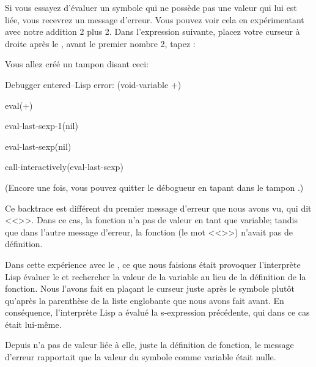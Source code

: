 Si vous essayez d'évaluer un symbole qui ne possède pas une valeur qui
lui est liée, vous recevrez un message d'erreur. Vous pouvez voir cela
en expérimentant avec notre addition 2 plus 2. Dans l'expression
suivante, placez votre curseur à droite après le \tm{+}, avant le
premier nombre 2, tapez  :
\begin{center}
\end{center}
Vous allez créé un tampon  disant ceci:
{\ttfamily
\begin{flushleft}
  Debugger entered--Lisp error: (void-variable +)

  eval(+)

  eval-last-sexp-1(nil)

  eval-last-sexp(nil)

  call-interactively(eval-last-sexp)
\end{flushleft}
}

(Encore une fois, vous pouvez quitter le débogueur en tapant 
dans le tampon .)

Ce backtrace est différent du premier message d'erreur que nous avons
vu, qui dit <<>>. Dans ce cas, la fonction n'a pas de valeur en tant que
variable; tandis que dans l'autre message d'erreur, la fonction (le
mot <<>>) n'avait pas de définition.

Dans cette expérience avec le \tm{+}, ce que nous faisions était
provoquer l'interprète Lisp évaluer le \tm{+} et rechercher la valeur
de la variable au lieu de la définition de la fonction. Nous l'avons
fait en plaçant le curseur juste après le symbole plutôt qu'après la
parenthèse de la liste englobante que nous avons fait avant. En
conséquence, l'interprète Lisp a évalué la s-expression précédente,
qui dans ce cas était \tm{+} lui-même.

Depuis \tm{+} n'a pas de valeur liée à elle, juste la définition de
fonction, le message d'erreur rapportait que la valeur du symbole
comme variable était nulle. 

